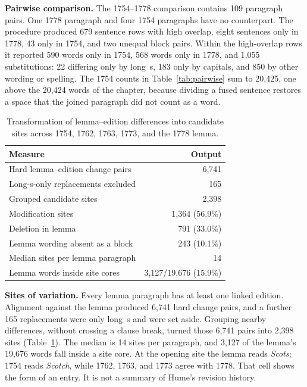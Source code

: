 \documentclass[sigconf,natbib,anonymous]{acmart}
\begin{document}
\textbf{Pairwise comparison.}
The 1754--1778 comparison contains 109 paragraph pairs.
One 1778 paragraph and four 1754 paragraphs have no counterpart.
The procedure produced 679 sentence rows with high overlap, eight sentences only in 1778, 43 only in 1754, and two unequal block pairs.
Within the high-overlap rows it reported 590 words only in 1754, 568 words only in 1778, and 1,055 substitutions: 22 differing only by long~s, 183 only by capitals, and 850 by other wording or spelling.
The 1754 counts in Table~\ref{tab:pairwise} sum to 20,425, one above the 20,424 words of the chapter, because dividing a fused sentence restores a space that the joined paragraph did not count as a word.

\begin{table}[t]
  \caption{Transformation of lemma--edition differences into candidate sites across 1754, 1762, 1763, 1773, and the 1778 lemma.}
  \label{tab:apparatus}
  \small
  \begin{tabular}{@{}>{\raggedright\arraybackslash}p{}r@{}}
    \toprule
    Measure & Output \\
    \midrule
    Hard lemma--edition change pairs & 6,741 \\
    Long-s-only replacements excluded & 165 \\
    Grouped candidate sites & 2,398 \\
    Modification sites & 1,364 (56.9\%) \\
    Deletion in lemma & 791 (33.0\%) \\
    Lemma wording absent as a block & 243 (10.1\%) \\
    Median sites per lemma paragraph & 14 \\
    Lemma words inside site cores & 3,127/19,676 (15.9\%) \\
    \bottomrule
  \end{tabular}
\end{table}

\textbf{Sites of variation.}
Every lemma paragraph has at least one linked edition.
Alignment against the lemma produced 6,741 hard change pairs, and a further 165 replacements were only long~s and were set aside.
Grouping nearby differences, without crossing a clause break, turned those 6,741 pairs into 2,398 sites (Table~\ref{tab:apparatus}).
The median is 14 sites per paragraph, and 3,127 of the lemma's 19,676 words fall inside a site core.
At the opening site the lemma reads \emph{Scots}; 1754 reads \emph{Scotch}, while 1762, 1763, and 1773 agree with 1778.
That cell shows the form of an entry.
It is not a summary of Hume's revision history.
\end{document}
